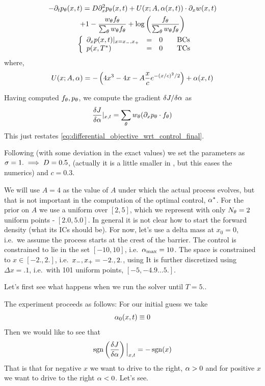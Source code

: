 \documentclass{article}
\begin{document}
\begin{equation}
\begin{gathered}
-{\partial}_t { p_{\theta}}(x,t) =
D {\partial}_x^2 { p_{\theta}}(x,t) +
U(x;A, {\alpha}(x,t))\cdot {\partial}_x w(x,t) \\
+ 1 - \frac{  w_{\theta} { f_{\theta}} }{\sum_{\theta} w_{\theta}{ f_{\theta}}} 
+ \log\left(\frac{f_{\theta}} {\sum_{\theta} { w_{\theta} } { f_{\theta}} }\right)
\\
\begin{array}{ll}
	&
	\left\{ \begin{array}{lcll}
	{\partial}_x p(x, t)|_{x = { x_{-} }, { x_{+} }}  &=& 0  \quad &\textrm{BCs}
	\\
	p(x,{ T^* })  &=& 0 \,& \textrm{TCs}
\end{array} \right.
\end{array}
\label{eq:backward_adjoint_double_well}
\end{gathered}
\end{equation}
where,  
$$
U(x; A, {\alpha}) = -\left( 4x^3 - 4x -A \frac xc e^{-(x/c)^2/2} \right) + {\alpha}(x,t) 
$$

Having computed ${ f_{\theta}}, { p_{\theta}}$, we compute the gradient $\delta J / \delta {\alpha}$
as
$$
\frac {\delta J}{\delta {\alpha}} |_{x,t} = \sum_{\theta} { w_{\theta} } ({\partial}_x { p_{\theta}} \cdot { f_{\theta}})
$$
This just restates \cref{eq:differential_objective_wrt_control_final}.

Following \cite{Lin} (with some deviation in the exact values) we set the
parameters as ${\sigma } = 1. \implies D = 0.5$, (actually it is a little smaller in
\cite{Lin}, but this eases the numerics) and $c = 0.3$.

We will use $A = 4$ as the value of $A$ under which the actual process evolves,
but that is not important in the computation of the optimal control, ${\alpha}^*$. For
the prior on $A$ we use a uniform over $[2,5]$, which we represent with
only $N_{\theta} = 2$ uniform points - $[2.0, 5.0]$.  In general it is
not clear how to start the forward density (what its ICs should be). 
For now, let's use a delta mass at $x_0 = 0$, i.e.\ we assume the process starts
at the crest of the barrier. The control is constrained to lie in the set $[-10, 10]$, i.e.\ ${ {\alpha}_{\textrm{max}} }
= 10$. The space is constrained to $x \in [-2.,2.]$, i.e.\ ${ x_{-} }, { x_{+} } =
-2.,2.$, using  It is further discretized using $\Delta x = .1$, i.e.\ with 101
uniform points, $[-5, -4.9\ldots 5.]$.

Let's first see what happens when we run the solver until $T = 5$..

The experiment proceeds as follows: For our initial guess we take $${\alpha}_0(x,t)
\equiv 0$$ Then we would like to see that 
$$ \operatorname{sgn} \left(\frac {\delta J}{\delta {\alpha}}\right) \Big|_{x,t} = - \operatorname{sgn}(x)$$
That is that for negative $x$ we want to drive to the right, ${\alpha} > 0$ and for
positive $x$ we want to drive to the right ${\alpha} < 0$. 
Let's see.  
\end{document}
